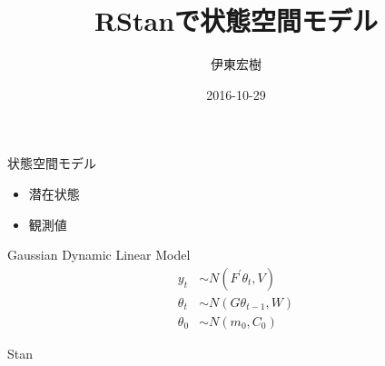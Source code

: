 \documentclass[dvipdfmx,12pt]{beamer}
\begin{document}
\title{RStanで状態空間モデル}
\author{伊東宏樹}
\date{2016-10-29}
\maketitle

\begin{frame}{状態空間モデル}
\begin{itemize}
\item 潜在状態
\item 観測値
\end{itemize}

\end{frame}

\begin{frame}{Gaussian Dynamic Linear Model}
  \begin{align*}
    y_t &\sim N(F^{\prime} \theta_t, V) \\
    \theta_t &\sim N(G \theta_{t-1}, W) \\
    \theta_0 &\sim N(m_0, C_0)
  \end{align*}

\end{frame}

\begin{frame}{Stan}

\end{frame}
\end{document}
